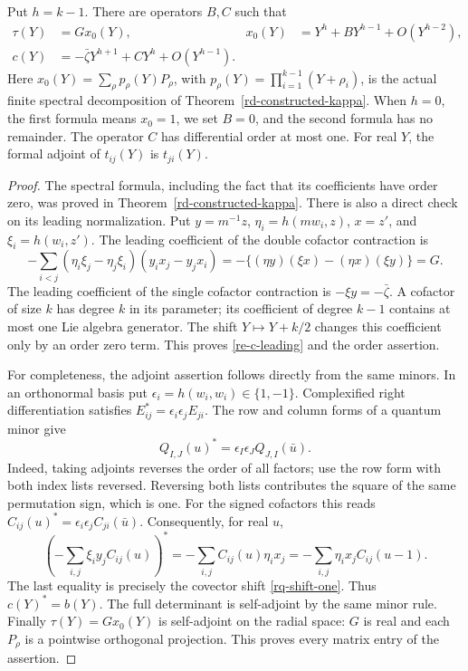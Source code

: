 \begin{lemma}\label{re-base-leading}
Put \(h=k-1\).  There are operators \(B,C\) such that
\begin{align}
 \tau(Y)&=Gx_0(Y),&
 x_0(Y)&=Y^h+B Y^{h-1}+O(Y^{h-2}),             \label{re-x-leading}\\
 c(Y)&=-\bar\zeta Y^{h+1}+C Y^h+O(Y^{h-1}).    \label{re-c-leading}
\end{align}
Here \(x_0(Y)=\sum_\rho p_\rho(Y)P_\rho\), with
\(p_\rho(Y)=\prod_{i=1}^{k-1}(Y+\rho_i)\), is the actual
finite spectral decomposition of
Theorem~\ref{rd-constructed-kappa}.
When \(h=0\), the first formula means \(x_0=1\), we set
\(B=0\), and the second formula has no remainder.
The operator \(C\) has differential order at most one.
For real \(Y\), the formal adjoint of \(t_{ij}(Y)\) is
\(t_{ji}(Y)\).
\end{lemma}

\begin{proof}
The spectral formula, including the fact that its coefficients
have order zero, was proved in
Theorem~\ref{rd-constructed-kappa}.
There is also a direct check on its leading normalization.
Put \(y=m^{-1}z\), \(\eta_i=h(mw_i,z)\),
\(x=z'\), and \(\xi_i=h(w_i,z')\).
The leading coefficient of the double cofactor contraction is
\[
 -\sum_{i<j}(\eta_i\xi_j-\eta_j\xi_i)(y_i x_j-y_jx_i)
 =-\{(\eta y)(\xi x)-(\eta x)(\xi y)\}=G.
\]
The leading coefficient of the single cofactor contraction is
\(-\xi y=-\bar\zeta\).  A cofactor of size \(k\) has degree
\(k\) in its parameter; its coefficient of degree \(k-1\)
contains at most one Lie algebra generator.  The shift
\(Y\mapsto Y+k/2\) changes this coefficient only by an order
zero term.  This proves \eqref{re-c-leading} and the order
assertion.

For completeness, the adjoint assertion follows directly from
the same minors.  In an orthonormal basis put
\(\epsilon_i=h(w_i,w_i)\in\{1,-1\}\).
Complexified right differentiation satisfies
\(E_{ij}^*=\epsilon_i\epsilon_jE_{ji}\).
The row and column forms of a quantum minor give
\[
 Q_{I,J}(u)^*=\epsilon_I\epsilon_J Q_{J,I}(\bar u).
\]
Indeed, taking adjoints reverses the order of all factors;
use the row form with both index lists reversed.  Reversing
both lists contributes the square of the same permutation sign,
which is one.  For the signed cofactors this reads
\(C_{ij}(u)^*=\epsilon_i\epsilon_jC_{ji}(\bar u)\).
Consequently, for real \(u\),
\[
 \left(-\sum_{i,j}\xi_i y_j C_{ij}(u)\right)^*
 =-\sum_{i,j}C_{ij}(u)\eta_i x_j
 =-\sum_{i,j}\eta_i x_j C_{ij}(u-1).
\]
The last equality is precisely the covector shift
\eqref{rq-shift-one}.  Thus \(c(Y)^*=b(Y)\).
The full determinant is self-adjoint by the same minor rule.
Finally \(\tau(Y)=Gx_0(Y)\) is self-adjoint on the radial
space: \(G\) is real and each \(P_\rho\) is a pointwise
orthogonal projection.  This proves every matrix entry of the
assertion.
\end{proof}

